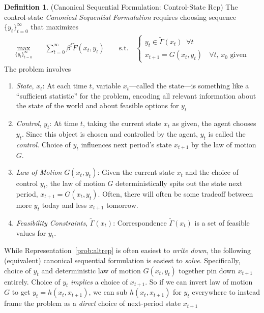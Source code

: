 \documentclass[12pt]{book}
\numberwithin{equation}{section} %
\theoremstyle{plain}
\theoremstyle{definition}
\newtheorem{defn}[thm]{Definition}
\theoremstyle{remark}
\newcommand{\sumtinfz}{\sum^\infty_{t=0}}
\begin{document}
\begin{defn}{(Canonical Sequential Formulation: Control-State Rep)}
\label{defn:sequential-altrep}
The control-state \emph{Canonical Sequential Formulation} requires
choosing sequence $\{y_{t}\}_{t=0}^\infty$ that maximizes
\begin{align}
  \label{prob:altrep}
  \max_{\{y_t\}_{t=0}^\infty}
  \quad &\sumtinfz \beta^t \tilde{F}(x_t,y_t)
  \qquad \text{s.t.}\quad
  \begin{cases}
  y_t \in \tilde{\Gamma}(x_t) \;\; \forall t\\
  \text{$x_{t+1} = G(x_t,y_t)$ $\;\forall t$, $x_0$ given}
  \end{cases}
\end{align}
The problem involves
\begin{enumerate}
  \item \emph{State}, $x_t$: At each time $t$, variable
    $x_t$---called the state---is something like a ``sufficient
    statistic'' for the problem, encoding all relevant information about
    the state of the world and about feasible options for $y_t$
  \item \emph{Control}, $y_{t}$: At time $t$, taking the current state
    $x_t$ as given, the agent chooses $y_{t}$.
    Since this object is chosen and controlled by the agent, $y_{t}$ is
    called the \emph{control}.
    Choice of $y_t$ influences next period's state $x_{t+1}$ by the law
    of motion $G$.
  \item \emph{Law of Motion} $G(x_t,y_t)$: Given the current state $x_t$
    and the choice of control $y_t$, the law of motion $G$
    deterministically spits out the state next period,
    $x_{t+1}=G(x_t,y_t)$.  Often, there will often be some tradeoff
    between more $y_t$ today and less $x_{t+1}$ tomorrow.

  \item \emph{Feasibility Constraints}, $\tilde{\Gamma}(x_t)$:
    Correspondence $\tilde{\Gamma}(x_t)$ is a set of feasible values
    for $y_{t}$.
\end{enumerate}
While Representation~\ref{prob:altrep} is often easiest to
\emph{write down}, the following (equivalent) canonical sequential
formulation is easiest to \emph{solve}.
Specifically, choice of $y_t$ and deterministic law of motion
$G(x_t,y_t)$ together pin down $x_{t+1}$ entirely.
Choice of $y_t$ \emph{implies} a choice of $x_{t+1}$.  So if we can
invert law of motion $G$ to get $y_t=h(x_t,x_{t+1})$, we can sub
$h(x_t,x_{t+1})$ for $y_t$ everywhere to instead frame the problem as
a \emph{direct} choice of next-period state $x_{t+1}$
\end{defn}
\end{document}
